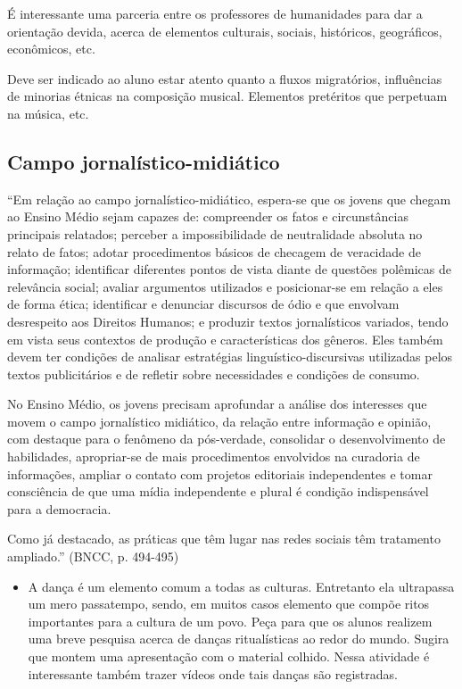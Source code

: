 \documentclass[12pt]{extarticle}
\begin{document}
{É interessante uma parceria entre os professores de humanidades
para dar a orientação devida, acerca de elementos culturais, sociais,
históricos, geográficos, econômicos, etc.}

{Deve ser indicado ao aluno estar atento quanto a fluxos
migratórios, influências de minorias étnicas na composição musical.
Elementos pretéritos que perpetuam na música, etc. }

\subsection{Campo jornalístico-midiático}

``Em relação ao campo jornalístico-midiático, espera-se que os jovens
que chegam ao Ensino Médio sejam capazes de: compreender os fatos e
circunstâncias principais relatados; perceber a impossibilidade de
neutralidade absoluta no relato de fatos; adotar procedimentos básicos
de checagem de veracidade de informação; identificar diferentes pontos
de vista diante de questões polêmicas de relevância social; avaliar
argumentos utilizados e posicionar-se em relação a eles de forma ética;
identificar e denunciar discursos de ódio e que envolvam desrespeito aos
Direitos Humanos; e produzir textos jornalísticos variados, tendo em
vista seus contextos de produção e características dos gêneros. Eles
também devem ter condições de analisar estratégias
linguístico-discursivas utilizadas pelos textos publicitários e de
refletir sobre necessidades e condições de consumo.

No Ensino Médio, os jovens precisam aprofundar a análise dos interesses
que movem o campo jornalístico midiático, da relação entre informação e
opinião, com destaque para o fenômeno da pós-verdade, consolidar o
desenvolvimento de habilidades, apropriar-se de mais procedimentos
envolvidos na curadoria de informações, ampliar o contato com projetos
editoriais independentes e tomar consciência de que uma mídia
independente e plural é condição indispensável para a democracia.

Como já destacado, as práticas que têm lugar nas redes sociais têm
tratamento ampliado.'' (BNCC, p. 494-495)

\begin{itemize}
\item
  A dança é um elemento comum a todas as culturas. Entretanto ela
  ultrapassa um mero passatempo, sendo, em muitos casos elemento que
  compõe ritos importantes para a cultura de um povo. Peça para que os
  alunos realizem uma breve pesquisa acerca de danças ritualísticas ao
  redor do mundo. Sugira que montem uma apresentação com o material
  colhido. Nessa atividade é interessante também trazer vídeos onde tais
  danças são registradas.
\end{itemize}
\end{document}
